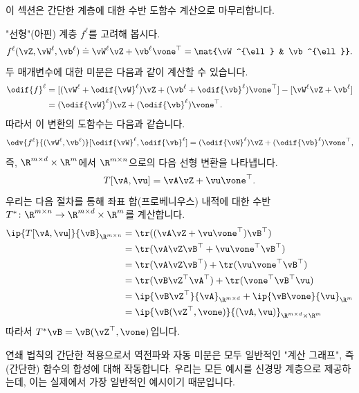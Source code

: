 \documentclass[../../book-main_ko.tex]{subfiles}
\begin{document}
이 섹션은 간단한 계층에 대한 수반 도함수 계산으로 마무리합니다.
\begin{example}
    "선형"(아핀) 계층 \(f^{\ell}\)를 고려해 봅시다.
    \begin{equation}
        f^{\ell}(\vZ, \vW^{\ell}, \vb^{\ell}) \doteq \vW^{\ell}\vZ + \vb^{\ell}\vone^{\top} = \mat{\vW^{\ell} & \vb^{\ell}}.
    \end{equation}
    두 매개변수에 대한 미분은 다음과 같이 계산할 수 있습니다.
    \begin{align}
        \odif{f}^{\ell}
        &= [(\vW^{\ell} + \odif{\vW}^{\ell})\vZ + (\vb^{\ell} + \odif{\vb}^{\ell})\vone^{\top}] - [\vW^{\ell}\vZ + \vb^{\ell}] \\
        &= (\odif{\vW}^{\ell})\vZ + (\odif{\vb}^{\ell})\vone^{\top}.
    \end{align}
    따라서 이 변환의 도함수는 다음과 같습니다.
    \begin{equation}
        \odv{f^{\ell}}{(\vW^{\ell}, \vb^{\ell})}[\odif{\vW}^{\ell}, \odif{\vb}^{\ell}] = (\odif{\vW}^{\ell})\vZ + (\odif{\vb}^{\ell})\vone^{\top},
    \end{equation}
    즉, \(\R^{m \times d} \times \R^{m}\)에서 \(\R^{m \times n}\)으로의 다음 선형 변환을 나타냅니다.
    \begin{equation}
        T[\vA, \vu] = \vA\vZ + \vu\vone^{\top}.
    \end{equation}
    우리는 다음 절차를 통해 좌표 합(프로베니우스) 내적에 대한 수반 \(T^{*} \colon \R^{m \times n} \to \R^{m \times d} \times \R^{m}\)를 계산합니다.
    \begin{align}
        \ip{T[\vA, \vu]}{\vB}_{\R^{m \times n}}
        &= \tr((\vA\vZ + \vu\vone^{\top})\vB^{\top}) \\
        &= \tr(\vA\vZ\vB^{\top} + \vu\vone^{\top}\vB^{\top}) \\
        &= \tr(\vA\vZ\vB^{\top}) + \tr(\vu\vone^{\top}\vB^{\top}) \\
        &= \tr(\vB\vZ^{\top}\vA^{\top}) + \tr(\vone^{\top}\vB^{\top}\vu) \\
        &= \ip{\vB\vZ^{\top}}{\vA}_{\R^{m \times d}} + \ip{\vB\vone}{\vu}_{\R^{m}} \\
        &= \ip{\vB(\vZ^{\top}, \vone)}{(\vA, \vu)}_{\R^{m \times d} \times \R^{m}}
    \end{align}
    따라서 \(T^{*}\vB = \vB(\vZ^{\top}, \vone)\)입니다.
\end{example}

연쇄 법칙의 간단한 적용으로서 역전파와 자동 미분은 모두 일반적인 "계산 그래프", 즉 (간단한) 함수의 합성에 대해 작동합니다. 우리는 모든 예시를 신경망 계층으로 제공하는데, 이는 실제에서 가장 일반적인 예시이기 때문입니다.
\end{document}

